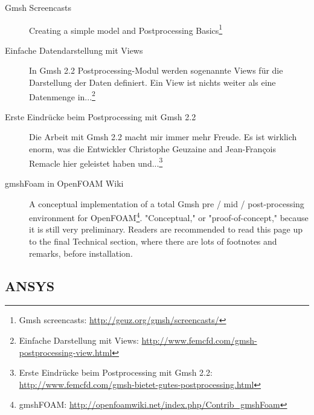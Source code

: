 \begin{description}
\item[Gmsh Screencasts]  Creating a simple model and Postprocessing Basics\footnote{Gmsh screencasts: \url{http://geuz.org/gmsh/screencasts/}}
\item[Einfache  Datendarstellung mit Views]  In Gmsh  2.2 Postprocessing-Modul
werden sogenannte Views für die  Darstellung der Daten definiert. Ein View ist
nichts  weiter  als eine  Datenmenge  in...\footnote{Einfache Darstellung  mit
Views: \url{http://www.femcfd.com/gmsh-postprocessing-view.html}}
\item[Erste Eindrücke  beim Postprocessing mit  Gmsh 2.2] Die Arbeit  mit Gmsh
2.2 macht  mir immer mehr  Freude. Es ist  wirklich enorm, was  die Entwickler
Christophe   Geuzaine   and  Jean-François   Remacle   hier  geleistet   haben
und...\footnote{Erste   Eindrücke   beim    Postprocessing   mit   Gmsh   2.2:
\url{http://www.femcfd.com/gmsh-bietet-gutes-postprocessing.html}}
\item[gmshFoam in OpenFOAM  Wiki] A conceptual implementation of  a total Gmsh
pre  /  mid  /  post-processing  environment  for  OpenFOAM\footnote{gmshFOAM:
\url{http://openfoamwiki.net/index.php/Contrib_gmshFoam}}.   "Conceptual,"  or
"proof-of-concept,"  because  it  is  still  very  preliminary.   Readers  are
recommended to read  this page up to the final  Technical section, where there
are lots of footnotes and remarks, before installation.
\end{description}

\newpage
\subsection{ANSYS}

